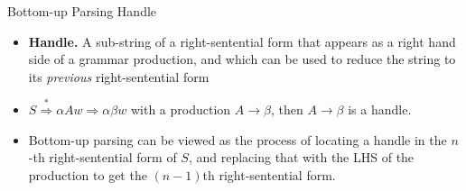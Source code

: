 \documentclass{beamer}
\begin{document}
\begin{frame}{Bottom-up Parsing}
{Handle}
\begin{itemize}
	\item \textbf{Handle.} A sub-string of a right-sentential form that appears as a right hand side of a grammar production, and which can be used to reduce the string to its \emph{previous} right-sentential form
	\item $S \stackrel{*}{\Rightarrow} \alpha A w \Rightarrow \alpha \beta w$ with a production $A \rightarrow \beta$, then $A \rightarrow \beta$ is a handle.
	\pause
	\item Bottom-up parsing can be viewed as the process of locating a handle in the $n$-th right-sentential form of $S$, and replacing that with the LHS of the production to get the $(n - 1)$th right-sentential form. 
\end{itemize}
\end{frame}
\end{document}
